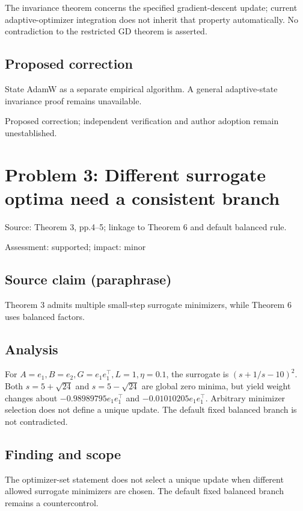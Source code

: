 \documentclass[11pt]{article}
\begin{document}
The invariance theorem concerns the specified gradient-descent update; current adaptive-optimizer integration does not inherit that property automatically. No contradiction to the restricted GD theorem is asserted.

\subsection*{Proposed correction}

State AdamW as a separate empirical algorithm. A general adaptive-state invariance proof remains unavailable.

Proposed correction; independent verification and author adoption remain unestablished.

\section*{Problem 3: Different surrogate optima need a consistent branch}

Source: Theorem 3, pp.4–5; linkage to Theorem 6 and default balanced rule.

Assessment: supported; impact: minor

\subsection*{Source claim (paraphrase)}

Theorem 3 admits multiple small-step surrogate minimizers, while Theorem 6 uses balanced factors.

\subsection*{Analysis}

For \(A=e_1,B=e_2,G=e_1e_1^\top,L=1,\eta=0.1\), the surrogate is \((s+1/s-10)^2\). Both \(s=5+\sqrt{24}\) and \(s=5-\sqrt{24}\) are global zero minima, but yield weight changes about \(-0.98989795e_1e_1^\top\) and \(-0.01010205e_1e_1^\top\). Arbitrary minimizer selection does not define a unique update. The default fixed balanced branch is not contradicted.

\subsection*{Finding and scope}

The optimizer-set statement does not select a unique update when different allowed surrogate minimizers are chosen. The default fixed balanced branch remains a countercontrol.
\end{document}
